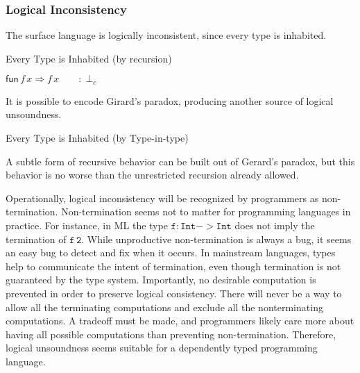 \subsubsection{Logical Inconsistency}

The surface language is logically inconsistent, since every type is inhabited.

\begin{example}
Every Type is Inhabited (by recursion)

$\mathsf{fun}\,f\,x\Rightarrow f\,x\qquad:\perp_{c}$
\end{example}

It is possible to encode Girard's paradox, producing another source of logical unsoundness.
\begin{example}
Every Type is Inhabited (by Type-in-type)


\end{example}

A subtle form of recursive behavior can be built out of Gerard's paradox\cite{Reinhold89typecheckingis}, but this behavior is no worse than the unrestricted recursion already allowed.


Operationally, logical inconsistency will be recognized by programmers as non-termination.
Non-termination seems not to matter for programming languages in practice.
For instance, in ML the type $\mathtt{f:Int->Int}$ does not imply the termination of $\mathtt{f\,2}$.
While unproductive non-termination is always a bug, it seems an easy bug to detect and fix when it occurs.
In mainstream languages, types help to communicate the intent of termination, even though termination is not guaranteed by the type system.
Importantly, no desirable computation is prevented in order to preserve logical consistency.
There will never be a way to allow all the terminating computations and exclude all the nonterminating computations.
A tradeoff must be made, and programmers likely care more about having all possible computations than preventing non-termination.
Therefore, logical unsoundness seems suitable for a dependently typed programming language.


